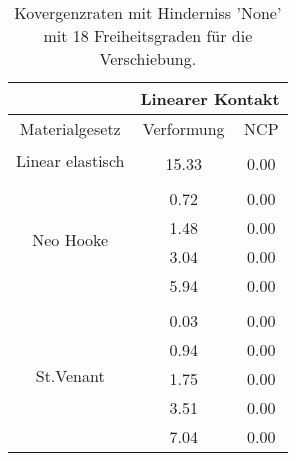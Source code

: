 \begin{table} 
\centering 
\begin{tabular}{c|cc|} 
\cline{2-3} 
 & \multicolumn{2}{|c|}{Linearer Kontakt} \\ 
\hline 
\multicolumn{1}{|c|}{Materialgesetz} & \multicolumn{1}{c|}{Verformung} & \multicolumn{1}{c|}{NCP} \\ 
\hline 
\multicolumn{1}{|c|}{\multirow{2}{*}{Linear elastisch}} &\multicolumn{1}{|c|}{} & \multicolumn{1}{|c|}{} \\ 
\multicolumn{1}{|c|}{} & \multicolumn{1}{|c|}{     15.33} & \multicolumn{1}{|c|}{      0.00} \\ 
\hline 
\multicolumn{1}{|c|}{\multirow{5}{*}{Neo Hooke}} &\multicolumn{1}{|c|}{} & \multicolumn{1}{|c|}{} \\ 
\multicolumn{1}{|c|}{} & \multicolumn{1}{|c|}{      0.72} & \multicolumn{1}{|c|}{      0.00} \\ 
\multicolumn{1}{|c|}{} & \multicolumn{1}{|c|}{      1.48} & \multicolumn{1}{|c|}{      0.00} \\ 
\multicolumn{1}{|c|}{} & \multicolumn{1}{|c|}{      3.04} & \multicolumn{1}{|c|}{      0.00} \\ 
\multicolumn{1}{|c|}{} & \multicolumn{1}{|c|}{      5.94} & \multicolumn{1}{|c|}{      0.00} \\ 
\hline 
\multicolumn{1}{|c|}{\multirow{6}{*}{St.Venant}} &\multicolumn{1}{|c|}{} & \multicolumn{1}{|c|}{} \\ 
\multicolumn{1}{|c|}{} & \multicolumn{1}{|c|}{      0.03} & \multicolumn{1}{|c|}{      0.00} \\ 
\multicolumn{1}{|c|}{} & \multicolumn{1}{|c|}{      0.94} & \multicolumn{1}{|c|}{      0.00} \\ 
\multicolumn{1}{|c|}{} & \multicolumn{1}{|c|}{      1.75} & \multicolumn{1}{|c|}{      0.00} \\ 
\multicolumn{1}{|c|}{} & \multicolumn{1}{|c|}{      3.51} & \multicolumn{1}{|c|}{      0.00} \\ 
\multicolumn{1}{|c|}{} & \multicolumn{1}{|c|}{      7.04} & \multicolumn{1}{|c|}{      0.00} \\ 
\hline 
\end{tabular}\caption{Kovergenzraten mit Hinderniss 'None' mit 18 Freiheitsgraden für die Verschiebung.}\label{tab:Rate_None_level0}
\end{table} 
